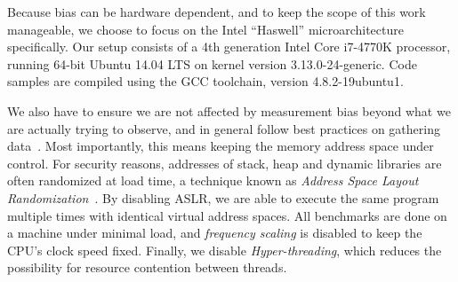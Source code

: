 \documentclass[a4paper,10pt,twocolumn,twoside]{article}
\begin{document}
Because bias can be hardware dependent, and to keep the scope of this work manageable, we choose to focus on the Intel ``Haswell'' microarchitecture specifically.
Our setup consists of a 4th generation Intel\textsuperscript{\textregistered{}} Core\texttrademark{} i7-4770K processor, running 64-bit Ubuntu 14.04 LTS on kernel version 3.13.0-24-generic.
Code samples are compiled using the {\small GCC} toolchain, version 4.8.2-19ubuntu1.

We also have to ensure we are not affected by measurement bias beyond what we are actually trying to observe, and in general follow best practices on gathering data~\cite{Mytkowicz:2009:WrongData}.
Most importantly, this means keeping the memory address space under control.
For security reasons, addresses of stack, heap and dynamic libraries are often randomized at load time, a technique known as \emph{Address Space Layout Randomization}~\cite{Shackham:2004:ASLR}. %
By disabling ASLR, we are able to execute the same program multiple times with identical virtual address spaces.
All benchmarks are done on a machine under minimal load, and \emph{frequency scaling} is disabled to keep the CPU's clock speed fixed.
Finally, we disable \emph{Hyper-threading}, which reduces the possibility for resource contention between threads.



%


\end{document}
